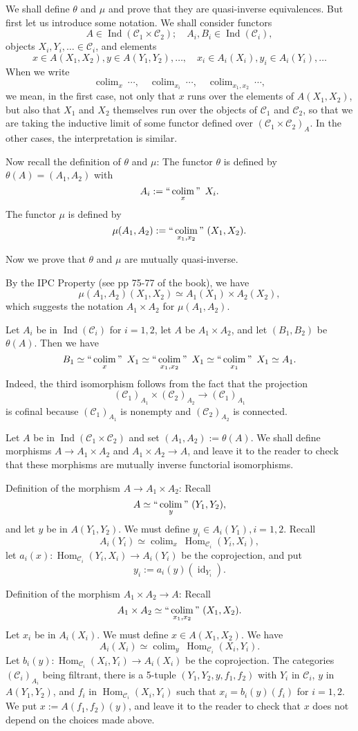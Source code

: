 \documentclass[12pt]{article}
\theoremstyle{remark}
\newcommand{\C}{\mathcal C}
\DeclareMathOperator*{\coli}{colim}
\DeclareMathOperator*{\co}{colim}
\DeclareMathOperator*{\ic}{``\coli"}
\DeclareMathOperator{\id}{id}
\DeclareMathOperator{\h}{Hom}
\DeclareMathOperator{\Ind}{Ind}
\begin{document}
We shall define $\theta$ and $\mu$ and prove that they are quasi-inverse equivalences. But first let us introduce some notation. We shall consider functors 
$$
A\in\Ind(\C_1\times\C_2);\quad A_i,B_i\in\Ind(\C_i), 
$$ 
objects $X_i,Y_i,\dots\in\C_i$, and elements 
$$
x\in A(X_1,X_2),y\in A(Y_1,Y_2),\dots,\quad x_i\in A_i(X_i),y_i\in A_i(Y_i),\dots
$$ 
When we write 
$$
\co_x\ \cdots,\quad \co_{x_i}\ \cdots,\quad \co_{x_1,x_2}\ \cdots,
$$ 
we mean, in the first case, not only that $x$ runs over the elements of $A(X_1,X_2)$, but also that $X_1$ and $X_2$ themselves run over the objects of $\C_1$ and $\C_2$, so that we are taking the inductive limit of some functor defined over $(\C_1\times\C_2)_A$. In the other cases, the interpretation is similar. 

Now recall the definition of $\theta$ and $\mu$: The functor $\theta$ is defined by $\theta(A)=(A_1,A_2)$ with 
$$
A_i:=\ic_x\ X_i. 
$$ 
The functor $\mu$ is defined by 
$$
\mu(A_1,A_2):=\ic_{x_1,x_2}\ (X_1,X_2). 
$$ 

Now we prove that $\theta$ and $\mu$ are mutually quasi-inverse. 

By the IPC Property (see pp 75-77 of the book), we have 
$$
\mu(A_1,A_2)(X_1,X_2)\simeq A_1(X_1)\times A_2(X_2), 
$$ 
which suggests the notation $A_1\times A_2$ for $\mu(A_1,A_2)$. 

Let $A_i$ be in $\Ind(\C_i)$ for $i=1,2$, let $A$ be $A_1\times A_2$, and let $(B_1,B_2)$ be $\theta(A)$. Then we have 
$$ 
B_1\simeq\ic_x\ X_1\simeq\ic_{x_1,x_2}\ X_1\simeq\ic_{x_1}\ X_1\simeq A_1.
$$ 
Indeed, the third isomorphism follows from the fact that the projection 
$$
(\C_1)_{A_1}\times (\C_2)_{A_2}\to(\C_1)_{A_1}
$$ 
is cofinal because $(\C_1)_{A_1}$ is nonempty and $(\C_2)_{A_2}$ is connected. 

Let $A$ be in $\Ind(\C_1\times\C_2)$ and set $(A_1,A_2):=\theta(A)$. We shall define morphisms $A\to A_1\times A_2$ and $A_1\times A_2\to A$, and leave it to the reader to check that these morphisms are mutually inverse functorial isomorphisms. 

Definition of the morphism $A\to A_1\times A_2$: Recall 
$$
A\simeq\ic_y\ (Y_1,Y_2), 
$$ 
and let $y$ be in $A(Y_1,Y_2)$. We must define $y_i\in A_i(Y_1),i=1,2$. Recall 
$$
A_i(Y_i)\simeq\co_x\ \h_{\C_i}(Y_i,X_i), 
$$ 
let $a_i(x):\h_{\C_i}(Y_i,X_i)\to A_i(Y_i)$ be the coprojection, and put 
$$
y_i:=a_i(y)(\id_{Y_i}). 
$$ 

Definition of the morphism $A_1\times A_2\to A$: Recall 
$$
A_1\times A_2\simeq\ic_{x_1,x_2}\ (X_1,X_2). 
$$ 
Let $x_i$ be in $A_i(X_i)$. We must define $x\in A(X_1,X_2)$. We have 
$$
A_i(X_i)\simeq\co_y\ \h_{\C_i}(X_i,Y_i). 
$$ 
Let $b_i(y):\h_{\C_i}(X_i,Y_i)\to A_i(X_i)$ be the coprojection. The categories $(\C_i)_{A_i}$ being filtrant, there is a 5-tuple $(Y_1,Y_2,y,f_1,f_2)$ with $Y_i$ in $\C_i$, $y$ in $A(Y_1,Y_2)$, and $f_i$ in $\h_{\C_i}(X_i,Y_i)$ such that $x_i=b_i(y)(f_i)$ for $i=1,2$. We put $x:=A(f_1,f_2)(y)$, and leave it to the reader to check that $x$ does not depend on the choices made above. 
\end{document}
